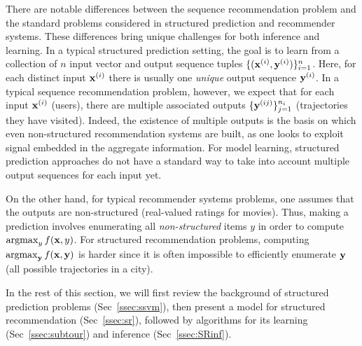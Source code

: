 There are notable differences between the sequence recommendation problem and %
the standard problems considered in structured prediction and recommender systems.
These differences bring unique challenges for both inference and learning.
In a typical structured prediction setting, the goal is to learn from a collection of $n$
input vector and output sequence tuples %
$\{ (\mathbf{x}^{({i})}, \mathbf{y}^{({i})}) \}_{i = 1}^n$. Here,
for each distinct input $\mathbf{x}^{({i})}$ there is usually one \emph{unique} output sequence $\mathbf{y}^{({i})}$.
In a typical sequence recommendation problem, however, we expect that %
for each input $\mathbf{x}^{({i})}$ (\eg users),
there %
are multiple associated outputs %
$\{ \mathbf{y}^{({ij})} \}_{j=1}^{n_i}$ (\eg trajectories they have visited).
Indeed, the existence of multiple outputs is the basis on which even non-structured recommendation systems are built, as one looks to exploit signal embedded in the aggregate information.
For model learning, structured prediction approaches do not have a standard way to take into account multiple output sequences %
for each input %
yet.

On the other hand, for typical recommender systems problems, one assumes that the outputs are non-structured (\eg real-valued ratings for movies).
Thus, making a prediction involves enumerating all {\em non-structured} items $y$ in order to compute $\operatorname*{argmax}_y f(\mathbf{x},y)$.
For structured recommendation problems, computing $\operatorname*{argmax}_{\mathbf{y}} f(\mathbf{x},\mathbf{y})$ is harder since it is often impossible to efficiently enumerate $\mathbf{y}$ (\eg all possible trajectories in a city).

In the rest of this section, we will first review the background of structured prediction problems (Sec~\ref{ssec:ssvm}), then present a model for structured recommendation (Sec~\ref{ssec:sr}), followed by algorithms for its learning (Sec~\ref{ssec:subtour}) and inference (Sec~\ref{ssec:SRinf}).


